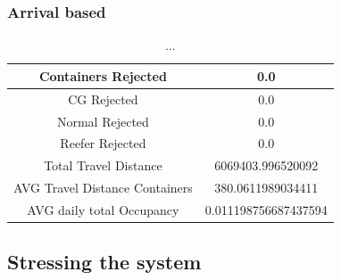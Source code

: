 \documentclass[]{article}
\begin{document}
\subsubsection{Arrival based}

\begin{table}[h]
	\centering
	\begin{tabular}{|c|c|}
		\hline
		Containers Rejected            & 0.0                  \\ \hline
		CG Rejected                    & 0.0                  \\ \hline
		Normal Rejected                & 0.0                  \\ \hline
		Reefer Rejected                & 0.0                  \\ \hline
		Total Travel Distance          & 6069403.996520092    \\ \hline
		AVG Travel Distance Containers & 380.0611989034411    \\ \hline
		AVG daily total Occupancy      & 0.011198756687437594 \\ \hline
	\end{tabular}
	\caption{...}
\end{table}
\subsection{Stressing the system}
\end{document}
